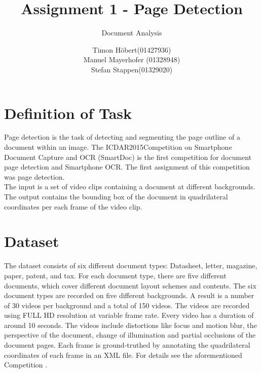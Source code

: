 \documentclass[english, paper=a4]{scrartcl}
\begin{document}
\graphicspath{{images/}}


\title{Assignment 1 - Page Detection} 

\subtitle{Document Analysis} 

\author{Timon Höbert(01427936) \\ Manuel Mayerhofer (01328948)\\ Stefan Stappen(01329020)}




\maketitle



\section{Definition of Task}
Page detection is the task of detecting and segmenting the page outline of a document within an image. The ICDAR2015Competition on Smartphone Document Capture and OCR (SmartDoc) \cite{burie2015icdar2015} is the first competition for document page detection and Smartphone OCR. The first assignment of this competition was page detection.\\
The input is a set of video clips containing a document at different backgrounds. The output contains the bounding box of the document in quadrilateral coordinates per each frame of the video clip.

\section{Dataset}
The dataset consists of six different document types: Datasheet, letter, magazine, paper, patent, and tax.
For each document type, there are five different documents, which cover different document layout schemes and contents.
The six document types are recorded on five different backgrounds. A result is a number of 30 videos per background and a total of 150 videos. The videos are recorded using FULL HD resolution at variable frame rate.  
Every video has a duration of around 10 seconds. The videos include distortions like focus and motion blur, the perspective of the document, change of illumination and partial occlusions of the document pages. Each frame is ground-truthed by annotating the quadrilateral coordinates of each frame in an XML file.
For details see the aforementioned Competition \cite{burie2015icdar2015}.
\end{document}

